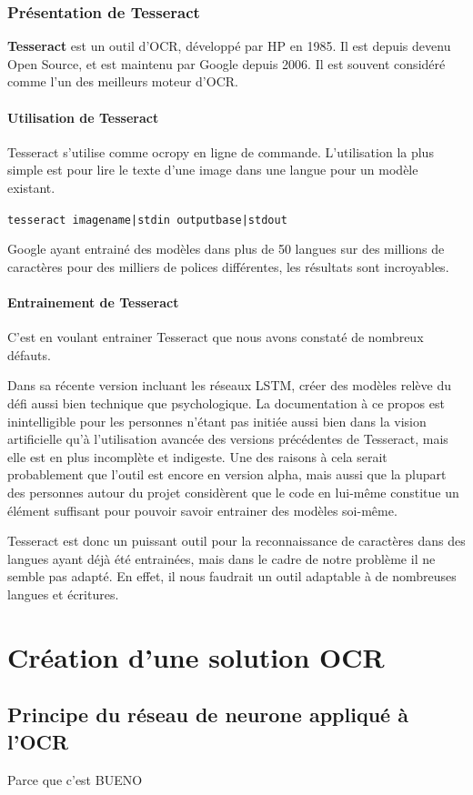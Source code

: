 \documentclass{report}
\begin{document}
\subsection{Présentation de Tesseract}

\textbf{Tesseract} est un outil d'OCR, développé par HP en 1985.
Il est depuis devenu Open Source, et est maintenu par Google depuis 2006.
Il est souvent considéré comme l'un des meilleurs moteur d'OCR.

\subsubsection{Utilisation de Tesseract}

Tesseract s'utilise comme ocropy en ligne de commande.
L'utilisation la plus simple est pour lire le texte d'une image dans une langue pour un modèle existant.

\texttt{tesseract imagename|stdin outputbase|stdout}

Google ayant entrainé des modèles dans plus de 50 langues sur des millions de caractères pour des milliers de polices différentes, les résultats sont incroyables.

\subsubsection{Entrainement de Tesseract}

C'est en voulant entrainer Tesseract que nous avons constaté de nombreux défauts.

Dans sa récente version incluant les réseaux LSTM, créer des modèles relève du défi aussi bien technique que psychologique.
La documentation à ce propos est inintelligible pour les personnes n'étant pas initiée aussi bien dans la vision artificielle qu'à l'utilisation avancée des versions précédentes de Tesseract, mais elle est en plus incomplète et indigeste.
Une des raisons à cela serait probablement que l'outil est encore en version alpha, mais aussi que la plupart des personnes autour du projet considèrent que le code en lui-même constitue un élément suffisant pour pouvoir savoir entrainer des modèles soi-même.

Tesseract est donc un puissant outil pour la reconnaissance de caractères dans des langues ayant déjà été entrainées, mais dans le cadre de notre problème il ne semble pas adapté.
En effet, il nous faudrait un outil adaptable à de nombreuses langues et écritures.

\chapter{Création d'une solution OCR}

\section{Principe du réseau de neurone appliqué à l'OCR}

Parce que c'est BUENO

\appendix
\end{document}
